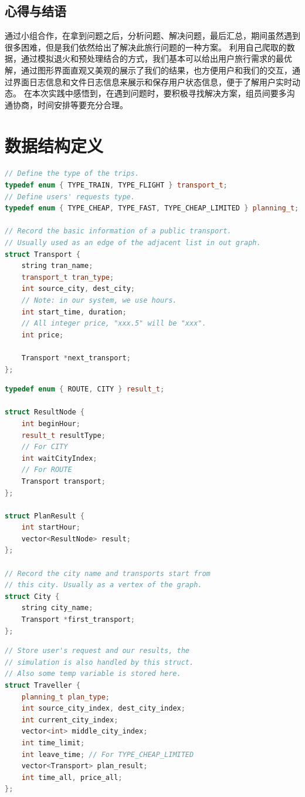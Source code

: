 \documentclass[lang=cn,blue,14pt]{elegantbook}
\begin{document}
\section{心得与结语}
通过小组合作，在拿到问题之后，分析问题、解决问题，最后汇总，期间虽然遇到很多困难，但是我们依然给出了解决此旅行问题的一种方案。
利用自己爬取的数据，通过模拟退火和预处理结合的方式，我们基本可以给出用户旅行需求的最优解，通过图形界面直观又美观的展示了我们的结果，也方便用户和我们的交互，通过界面日志信息和文件日志信息来展示和保存用户状态信息，便于了解用户实时动态。
在本次实践中感悟到，在遇到问题时，要积极寻找解决方案，组员间要多沟通协商，时间安排等要充分合理。
\appendix
\chapter{数据结构定义}

\begin{lstlisting}[language=C++,caption={Transport 的定义},captionpos=b]
// Define the type of the trips.
typedef enum { TYPE_TRAIN, TYPE_FLIGHT } transport_t;
// Define users' requests type.
typedef enum { TYPE_CHEAP, TYPE_FAST, TYPE_CHEAP_LIMITED } planning_t;

// Record the basic information of a public transport.
// Usually used as an edge of the adjacent list in out graph.
struct Transport {
	string tran_name;
	transport_t tran_type;
	int source_city, dest_city;
	// Note: in our system, we use hours.
	int start_time, duration;
	// All integer price, "xxx.5" will be "xxx".
	int price;

	Transport *next_transport;
};
\end{lstlisting}

\begin{lstlisting}[language=C++,caption={City 以及 PlanResult 的定义},captionpos=b]
typedef enum { ROUTE, CITY } result_t;

struct ResultNode {
	int beginHour;
	result_t resultType;
	// For CITY
	int waitCityIndex;
	// For ROUTE
	Transport transport;
};

struct PlanResult {
	int startHour;
	vector<ResultNode> result;
};

// Record the city name and transports start from
// this city. Usually as a vertex of the graph.
struct City {
	string city_name;
	Transport *first_transport;
};
\end{lstlisting}

\begin{lstlisting}[language=C++,caption={Traveller 的定义},captionpos=b]
// Store user's request and our results, the
// simulation is also handled by this struct.
// Also some temp variable is stored here.
struct Traveller {
	planning_t plan_type;
	int source_city_index, dest_city_index;
	int current_city_index;
	vector<int> middle_city_index;
	int time_limit;
	int leave_time; // For TYPE_CHEAP_LIMITED
	vector<Transport> plan_result;
	int time_all, price_all;
};
\end{lstlisting}
\end{document}
